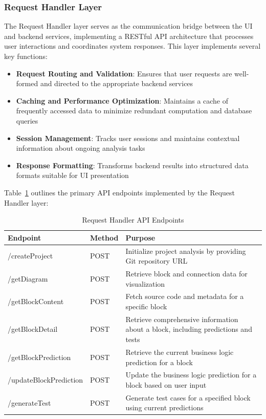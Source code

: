 \subsubsection{Request Handler Layer}

\hspace{0.5cm}The Request Handler layer serves as the communication bridge between the UI and backend services, implementing a RESTful API architecture that processes user interactions and coordinates system responses. This layer implements several key functions:

\begin{itemize}
    \item \textbf{Request Routing and Validation}: Ensures that user requests are well-formed and directed to the appropriate backend services
    
    \item \textbf{Caching and Performance Optimization}: Maintains a cache of frequently accessed data to minimize redundant computation and database queries
    
    \item \textbf{Session Management}: Tracks user sessions and maintains contextual information about ongoing analysis tasks
    
    \item \textbf{Response Formatting}: Transforms backend results into structured data formats suitable for UI presentation
\end{itemize}

\hspace{0.5cm}Table~\ref{tab:api-endpoints} outlines the primary API endpoints implemented by the Request Handler layer:

\begin{table}[H]
	\centering
	\begin{tabular}{|l|p{3cm}|p{8cm}|}
		\hline
		\textbf{Endpoint} & \textbf{Method} & \textbf{Purpose} \\ \hline
		/createProject & POST & Initialize project analysis by providing Git repository URL \\ \hline
		/getDiagram & POST & Retrieve block and connection data for visualization \\ \hline
		/getBlockContent & POST & Fetch source code and metadata for a specific block \\ \hline
		/getBlockDetail & POST & Retrieve comprehensive information about a block, including predictions and tests \\ \hline
		/getBlockPrediction & POST & Retrieve the current business logic prediction for a block \\ \hline
		/updateBlockPrediction & POST & Update the business logic prediction for a block based on user input \\ \hline
		/generateTest & POST & Generate test cases for a specified block using current predictions \\ \hline
	\end{tabular}
	\caption{Request Handler API Endpoints}
	\label{tab:api-endpoints}
\end{table}

